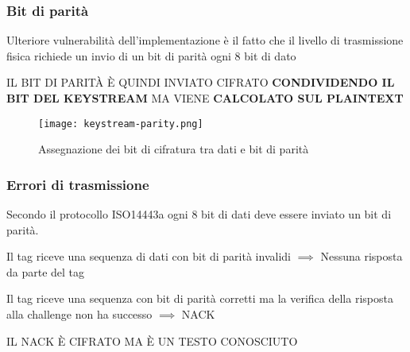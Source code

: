 \begin{frame}
    \frametitle{Bit di parità}
    \label{sec:parity-enc}
    Ulteriore vulnerabilità dell'implementazione è il fatto che il livello di trasmissione fisica richiede 
    un invio di un bit di parità ogni 8 bit di dato

    IL BIT DI PARITÀ È QUINDI INVIATO CIFRATO \textbf{CONDIVIDENDO IL BIT DEL KEYSTREAM} MA VIENE \textbf{CALCOLATO SUL PLAINTEXT}\cite{Courtois2009TheDS}

    \begin{figure}
        \centering
        \texttt{[image: keystream-parity.png]}
        \caption{Assegnazione dei bit di cifratura tra dati e bit di parità}
        \label{fig:keystream-parity}
    \end{figure}
\end{frame}

\begin{frame}
    \frametitle{Errori di trasmissione}
    \label{sec:parity-bit-vuln}
    Secondo il protocollo ISO14443a ogni 8 bit di dati deve essere inviato un bit di parità.\pause

    Il tag riceve una sequenza di dati con bit di parità invalidi $\implies$ Nessuna risposta da parte del tag\pause

    Il tag riceve una sequenza con bit di parità corretti ma la verifica della risposta alla challenge non ha successo $\implies$ NACK\pause

    {\large IL NACK È CIFRATO MA È UN TESTO CONOSCIUTO}
\end{frame}
